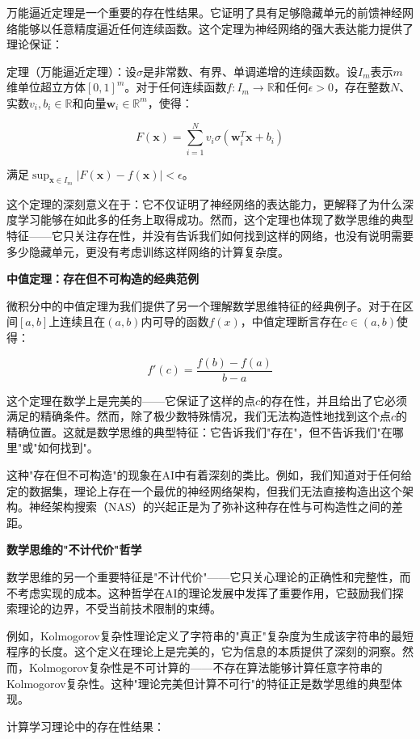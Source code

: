 万能逼近定理是一个重要的存在性结果。它证明了具有足够隐藏单元的前馈神经网络能够以任意精度逼近任何连续函数。这个定理为神经网络的强大表达能力提供了理论保证：

定理（万能逼近定理）：设$\sigma$是非常数、有界、单调递增的连续函数。设$I_m$表示$m$维单位超立方体$[0,1]^m$。对于任何连续函数$f: I_m \to \mathbb{R}$和任何$\epsilon > 0$，存在整数$N$、实数$v_i, b_i \in \mathbb{R}$和向量$\mathbf{w}_i \in \mathbb{R}^m$，使得：

$$F(\mathbf{x}) = \sum_{i=1}^{N} v_i \sigma(\mathbf{w}_i^T \mathbf{x} + b_i)$$

满足$\sup_{\mathbf{x} \in I_m} |F(\mathbf{x}) - f(\mathbf{x})| < \epsilon$。

这个定理的深刻意义在于：它不仅证明了神经网络的表达能力，更解释了为什么深度学习能够在如此多的任务上取得成功。然而，这个定理也体现了数学思维的典型特征——它只关注存在性，并没有告诉我们如何找到这样的网络，也没有说明需要多少隐藏单元，更没有考虑训练这样网络的计算复杂度。

\textbf{中值定理：存在但不可构造的经典范例}

微积分中的中值定理为我们提供了另一个理解数学思维特征的经典例子。对于在区间$[a,b]$上连续且在$(a,b)$内可导的函数$f(x)$，中值定理断言存在$c \in (a,b)$使得：

$$f'(c) = \frac{f(b) - f(a)}{b - a}$$

这个定理在数学上是完美的——它保证了这样的点$c$的存在性，并且给出了它必须满足的精确条件。然而，除了极少数特殊情况，我们无法构造性地找到这个点$c$的精确位置。这就是数学思维的典型特征：它告诉我们"存在"，但不告诉我们"在哪里"或"如何找到"。

这种"存在但不可构造"的现象在AI中有着深刻的类比。例如，我们知道对于任何给定的数据集，理论上存在一个最优的神经网络架构，但我们无法直接构造出这个架构。神经架构搜索（NAS）的兴起正是为了弥补这种存在性与可构造性之间的差距。

\textbf{数学思维的"不计代价"哲学}

数学思维的另一个重要特征是"不计代价"——它只关心理论的正确性和完整性，而不考虑实现的成本。这种哲学在AI的理论发展中发挥了重要作用，它鼓励我们探索理论的边界，不受当前技术限制的束缚。

例如，Kolmogorov复杂性理论定义了字符串的"真正"复杂度为生成该字符串的最短程序的长度。这个定义在理论上是完美的，它为信息的本质提供了深刻的洞察。然而，Kolmogorov复杂性是不可计算的——不存在算法能够计算任意字符串的Kolmogorov复杂性。这种"理论完美但计算不可行"的特征正是数学思维的典型体现。

计算学习理论中的存在性结果：


